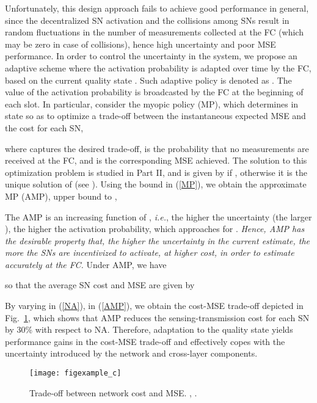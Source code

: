 \documentclass[10pt,twocolumn,twoside]{IEEEtran}
\theoremstyle{plain}
\begin{document}
 
 Unfortunately, this design approach
 fails to achieve good performance in general,
since the decentralized SN activation and the collisions among SNs result in
random fluctuations in the number of measurements collected at the FC (which may be zero in case of collisions),
hence high uncertainty and poor MSE performance.
In order to control the uncertainty in the system, we propose an adaptive scheme
   where the activation probability  is adapted over time by the FC, based on the current quality
  state . Such adaptive policy is denoted as .
    The value of the activation probability  is broadcasted by the FC at the beginning of each slot.
    In particular, consider the myopic policy (MP), which 
   determines  in state  so as to 
    optimize a trade-off between the instantaneous 
    expected MSE and the cost for each SN,
    
    where  captures the desired trade-off,  is the probability that 
    no measurements are received at the FC, and  is the corresponding MSE achieved.
    The solution to this optimization problem is studied in Part II, and is given by
     if  ,
    otherwise it is the unique  solution of
     (see  \cite[Corollary~2]{MichelusiP2}).    
    Using the bound  in (\ref{MP}),
    we obtain the approximate MP (AMP), upper bound to ,
    
The AMP
     is an increasing function of , 
    \emph{i.e.}, the higher the uncertainty (the larger ), the higher the activation probability,
    which approaches  for .
\emph{Hence, AMP has the desirable property that,
the higher the uncertainty in the current estimate, the more the SNs are 
incentivized to activate, at higher cost, in order to estimate  accurately at the FC.}
Under AMP, we have
    
so that  the average SN cost and MSE
 are given by
 
 By varying  in (\ref{NA}),  in (\ref{AMP}), we obtain
  the cost-MSE  trade-off depicted in Fig.~\ref{TOYEX},
 which shows that AMP reduces the sensing-transmission cost for each SN by 30\% with respect to NA.
 Therefore,
  adaptation
 to the quality state yields performance gains in the cost-MSE trade-off and 
 effectively copes with the uncertainty introduced by the network and cross-layer components.
 
 \begin{figure}[t]
\centering
\texttt{[image: figexample\_c]}
\vspace{-3mm}
\caption{Trade-off between network cost and MSE. , .}\label{TOYEX}
\vspace{-5mm}
\end{figure}
\end{document}
